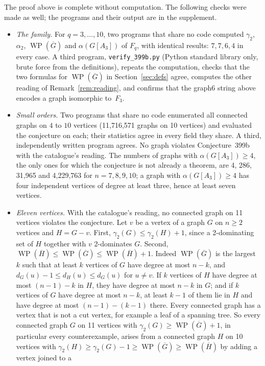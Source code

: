\documentclass[11pt,a4paper]{article}
\theoremstyle{definition}
\theoremstyle{remark}
\newcommand{\Gc}{\overline{G}}
\newcommand{\WP}{\operatorname{WP}}
\begin{document}
The proof above is complete without computation. The following checks were made as well; the
programs and their output are in the supplement.
\begin{itemize}
\item \emph{The family.} For $q=3,\dots,10$, two programs that share no code computed
$\gamma_2$, $\alpha_2$, $\WP(\Gc)$ and $\alpha(G[A_3])$ of $F_q$, with identical results:
$7,7,6,4$ in every case. A third program, \texttt{verify\_399b.py} (Python standard library
only, brute force from the definitions), repeats the computation, checks that the two formulas for
$\WP(\Gc)$ in Section~\ref{sec:defs} agree, computes the other reading of
Remark~\ref{rem:reading}, and confirms that the graph6 string above encodes a graph isomorphic
to~$F_3$.
\item \emph{Small orders.} Two programs that share no code enumerated all connected graphs on $4$
to $10$ vertices (11,716,571 graphs on 10 vertices) and evaluated the conjecture on each; their
statistics agree in every field they share. A third, independently written program agrees. No graph
violates Conjecture~399b with the catalogue's reading. The numbers of graphs with
$\alpha(G[A_3])\ge 4$, the only ones for which the conjecture is not already a theorem, are 4, 286,
31,965 and 4,229,763 for $n=7,8,9,10$; a graph with $\alpha(G[A_3])\ge 4$ has four independent
vertices of degree at least three, hence at least seven vertices.
\item \emph{Eleven vertices.} With the catalogue's reading, no connected graph on 11 vertices
violates the conjecture. Let $v$ be a vertex of a graph $G$ on $n\ge 2$ vertices and $H=G-v$.
First, $\gamma_2(G)\le\gamma_2(H)+1$, since a 2-dominating set of $H$ together with $v$
2-dominates $G$. Second, $\WP(\overline{H})\le\WP(\Gc)\le\WP(\overline{H})+1$. Indeed $\WP(\Gc)$ is
the largest $k$ such that at least $k$ vertices of $G$ have degree at most $n-k$, and
$d_G(u)-1\le d_H(u)\le d_G(u)$ for $u\ne v$. If $k$ vertices of $H$ have degree at most
$(n-1)-k$ in $H$, they have degree at most $n-k$ in $G$; and if $k$ vertices of $G$ have degree at
most $n-k$, at least $k-1$ of them lie in $H$ and have degree at most $(n-1)-(k-1)$ there. Every
connected graph has a vertex that is not a cut vertex, for example a leaf of a spanning tree. So
every connected graph $G$ on 11 vertices with $\gamma_2(G)\ge\WP(\Gc)+1$, in particular every
counterexample, arises from a connected graph $H$ on 10 vertices with
$\gamma_2(H)\ge\gamma_2(G)-1\ge\WP(\Gc)\ge\WP(\overline{H})$ by adding a vertex joined to a

\end{itemize}
\end{document}
